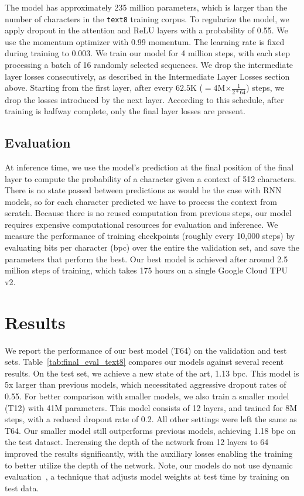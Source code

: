 The model has approximately 235 million parameters, which is larger than the number of characters in the \texttt{text8} training corpus. To regularize the model, we apply dropout in the attention and ReLU layers with a probability of 0.55. We use the momentum optimizer with 0.99 momentum. The learning rate is fixed during training to 0.003. We train our model for 4 million steps, with each step processing a batch of 16 randomly selected sequences. We drop the intermediate layer losses consecutively, as described in the Intermediate Layer Losses section above. Starting from the first layer, after every $62.5$K ($=4$M$\times \frac{1}{2*64}$) steps, we drop the losses introduced by the next layer. According to this schedule, after training is halfway complete, only the final layer losses are present.

\subsection{Evaluation}
At inference time, we use the model's prediction at the final position of the final layer to compute the probability of a character given a context of 512 characters. There is no state passed between predictions as would be the case with RNN models, so for each character predicted we have to process the context from scratch. Because there is no reused computation from previous steps, our model requires expensive computational resources for evaluation and inference. We measure the performance of training checkpoints (roughly every 10,000 steps) by evaluating bits per character (bpc) over the entire the validation set, and save the parameters that perform the best. Our best model is achieved after around 2.5 million steps of training, which takes 175 hours on a single Google Cloud TPU v2. 

\section{Results}

We report the performance of our best model (\textsc{T64}) on the validation and test sets.
Table~\ref{tab:final_eval_text8} compares our models against several recent results. On the test set, we achieve a new state of the art, 1.13 bpc. This model is 5x larger than previous models, which necessitated aggressive dropout rates of 0.55. For better comparison with smaller models, we also train a smaller model (\textsc{T12}) with 41M parameters. This model consists of 12 layers, and trained for 8M steps, with a reduced dropout rate of 0.2. All other settings were left the same as \textsc{T64}.
Our smaller model still outperforms previous models, achieving 1.18 bpc on the test dataset. Increasing the depth of the network from 12 layers to 64 improved the results significantly, with the auxiliary losses enabling the training to better utilize the depth of the network. Note, our models do not use dynamic evaluation~\cite{krause2017dynamic}, a technique that adjusts model weights at test time by training on test data.

